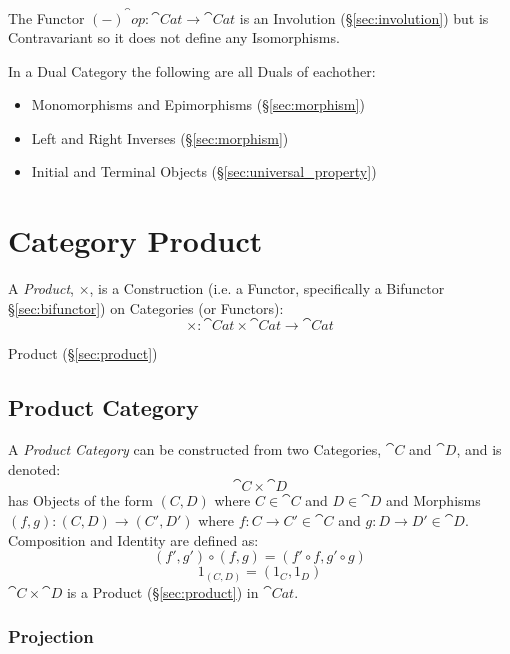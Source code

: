 The Functor $(-)^\cat{op} : \cat{Cat} \rightarrow \cat{Cat}$
is an Involution (\S\ref{sec:involution}) but is Contravariant so it
does not define any Isomorphisms.

In a Dual Category the following are all Duals of eachother:
\begin{itemize}
  \item Monomorphisms and Epimorphisms (\S\ref{sec:morphism})
  \item Left and Right Inverses (\S\ref{sec:morphism})
  \item Initial and Terminal Objects (\S\ref{sec:universal_property})
\end{itemize}



\section{Category Product}\label{sec:category_product}

A \emph{Product}, $\times$, is a Construction (i.e. a Functor,
specifically a Bifunctor \S\ref{sec:bifunctor}) on Categories (or
Functors):
\[
  \times : \cat{Cat} \times \cat{Cat} \rightarrow \cat{Cat}
\]

Product (\S\ref{sec:product})



\subsection{Product Category}\label{sec:product_category}

A \emph{Product Category} can be constructed from two Categories,
$\cat{C}$ and $\cat{D}$, and is denoted:
\[
  \cat{C} \times \cat{D}
\]
has Objects of the form $(C,D)$ where $C \in \cat{C}$ and $D \in
\cat{D}$ and Morphisms $(f,g) : (C,D) \rightarrow (C',D')$ where $f
: C \rightarrow C' \in \cat{C}$ and $g : D \rightarrow D' \in
\cat{D}$. Composition and Identity are defined as:
\[
  (f',g') \circ (f,g) = (f' \circ f,g' \circ g)
\]\[
  1_{(C,D)} = (1_C, 1_D)
\]
$\cat{C} \times \cat{D}$ is a Product (\S\ref{sec:product}) in
$\cat{Cat}$.



\subsubsection{Projection}\label{sec:projection_functor}

